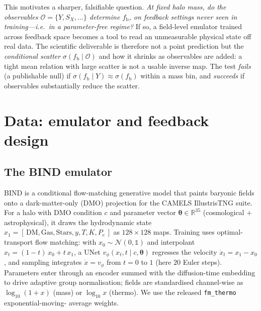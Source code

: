\documentclass[11pt]{article}
\newcommand{\fb}{f_{\mathrm{b}}}
\newcommand{\Ysz}{Y}
\newcommand{\Sx}{S_X}
\newcommand{\thetav}{\bm{\theta}}
\begin{document}
This motivates a sharper, falsifiable question. \emph{At fixed halo mass, do the
observables $\mathcal{O}=\{\Ysz,\Sx,\dots\}$ determine $\fb$, on feedback settings
never seen in training---i.e.\ in a parameter-free regime?} If so, a field-level
emulator trained across feedback space becomes a tool to read an unmeasurable
physical state off real data. The scientific deliverable is therefore not a point
prediction but the \emph{conditional scatter} $\sigma(\fb\mid\mathcal{O})$ and how it
shrinks as observables are added: a tight mean relation with large scatter is not a
usable inverse map. The test \emph{fails} (a publishable null) if
$\sigma(\fb\mid\Ysz)\approx\sigma(\fb)$ within a mass bin, and \emph{succeeds} if
observables substantially reduce the scatter.

\section{Data: emulator and feedback design}
\label{sec:data}

\subsection{The BIND emulator}
BIND is a conditional flow-matching generative model that paints baryonic fields
onto a dark-matter-only (DMO) projection for the CAMELS IllustrisTNG suite. For a
halo with DMO condition $c$ and parameter vector $\thetav\in\mathbb{R}^{35}$
(cosmological $+$ astrophysical), it draws the hydrodynamic state
$x_1=[\,\mathrm{DM},\mathrm{Gas},\mathrm{Stars},y,T,K,P_e\,]$ as $128\times128$ maps.
Training uses optimal-transport flow matching: with $x_0\sim\mathcal{N}(0,\mathbb{1})$
and interpolant $x_t=(1-t)\,x_0+t\,x_1$, a UNet $v_\phi(x_t,t\mid c,\thetav)$
regresses the velocity $\dot{x}_t=x_1-x_0$, and sampling integrates
$\dot{x}=v_\phi$ from $t{=}0$ to $1$ (here $20$ Euler steps). Parameters enter through
an encoder summed with the diffusion-time embedding to drive adaptive group
normalisation; fields are standardised channel-wise as $\log_{10}(1+x)$ (mass) or
$\log_{10}x$ (thermo). We use the released \texttt{fm\_thermo} exponential-moving-%
average weights.
\end{document}
